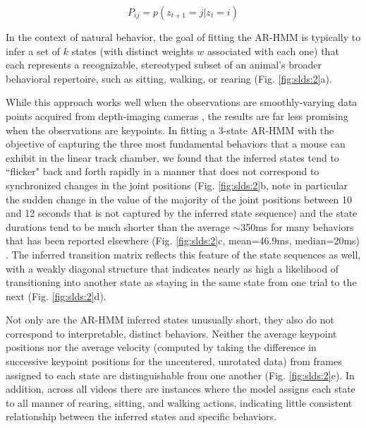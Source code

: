 \begin{equation}
\label{eq:slds_2}
    P_{ij} = p\left( {z_{t + 1} = j|z_t = i} \right)
\end{equation}

In the context of natural behavior, the goal of fitting the AR-HMM is typically to infer a set of $k$ states (with distinct weights $w$ associated with each one) that each represents a recognizable, stereotyped subset of an animal's broader behavioral repertoire, such as sitting, walking, or rearing (Fig. \ref{fig:slds:2}a).

While this approach works well when the observations are smoothly-varying data points acquired from depth-imaging cameras \cite{wiltschko_mapping_2015, markowitz_striatum_2018, wiltschko_revealing_2020}, the results are far less promising when the observations are keypoints. In fitting a 3-state AR-HMM with the objective of capturing the three most fundamental behaviors that a mouse can exhibit in the linear track chamber, we found that the inferred states tend to ``flicker" back and forth rapidly in a manner that does not correspond to synchronized changes in the joint positions (Fig. \ref{fig:slds:2}b, note in particular the sudden change in the value of the majority of the joint positions between 10 and 12 seconds that is not captured by the inferred state sequence) and the state durations tend to be much shorter than the average $\sim$350ms for many behaviors that has been reported elsewhere (Fig. \ref{fig:slds:2}c, mean=46.9ms, median=20ms) \cite{wiltschko_mapping_2015}. The inferred transition matrix reflects this feature of the state sequences as well, with a weakly diagonal structure that indicates nearly as high a likelihood of transitioning into another state as staying in the same state from one trial to the next (Fig. \ref{fig:slds:2}d). 

Not only are the AR-HMM inferred states unusually short, they also do not correspond to interpretable, distinct behaviors. Neither the average keypoint positions nor the average velocity (computed by taking the difference in successive keypoint positions for the uncentered, unrotated data) from frames assigned to each state are distinguishable from one another (Fig. \ref{fig:slds:2}e). In addition, across all videos there are instances where the model assigns each state to all manner of rearing, sitting, and walking actions, indicating little consistent relationship between the inferred states and specific behaviors. 

